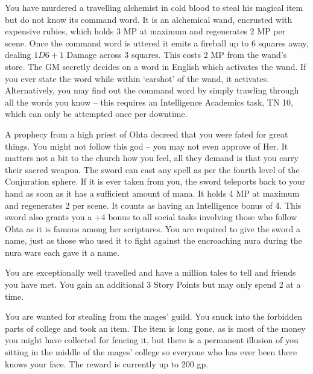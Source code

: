 \setcounter{list}{0}
\begin{list}{\addtocounter{list}{1}\textbf{:}}{\raggedleft}

	\item{ You have murdered a travelling alchemist in cold blood to steal his magical item but do not know its command word.  It is an alchemical wand, encrusted with expensive rubies, which holds 3 MP at maximum and regenerates 2 MP per scene.  Once the command word is uttered it emits a fireball up to 6 squares away, dealing $1D6+1$ Damage across 3 squares.   This costs 2 MP from the wand's store.  The GM secretly decides on a word in English which activates the wand.  If you ever state the word while within `earshot' of the wand, it activates.  Alternatively, you may find out the command word by simply trawling through all the words you know -- this requires an Intelligence  Academics task, TN 10, which can only be attempted once per downtime. }

	\item{ A prophecy from a high priest of Ohta decreed that you were fated for great things.  You might not follow this god -- you may not even approve of Her.  It matters not a bit to the church how you feel, all they demand is that you carry their sacred weapon.  The sword can cast any spell as per the fourth level of the Conjuration sphere.  If it is ever taken from you, the sword teleports back to your hand as soon as it has a sufficient amount of mana.  It holds 4 MP at maximum and regenerates 2 per scene.  It counts as having an Intelligence bonus of 4.  This sword also grants you a +4 bonus to all social tasks involving those who follow Ohta as it is famous among her scriptures.  You are required to give the sword a name, just as those who used it to fight against the encroaching nura during the nura wars each gave it a name.}

	\item{You are exceptionally well travelled and have a million tales to tell and friends you have met.  You gain an additional 3 Story Points but may only spend 2 at a time. }

	\item{ You are wanted for stealing from the mages' guild.  You snuck into the forbidden parts of \gls{college} and took an item.  The item is long gone, as is most of the money you might have collected for fencing it, but there is a permanent illusion of you sitting in the middle of the mages' \gls{college} so everyone who has ever been there knows your face.  The reward is currently up to 200 gp. }


\end{list}
